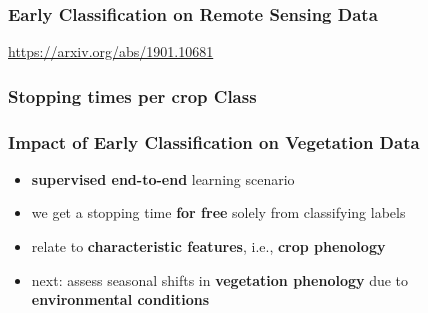 %	
%	
%	


\begin{frame}
\frametitle{Early Classification on Remote Sensing Data}


\url{https://arxiv.org/abs/1901.10681}


\end{frame}

\begin{frame}
	\frametitle{Stopping times per crop Class}
	
	
	
\end{frame}

\begin{frame}
	\frametitle{Impact of Early Classification on Vegetation Data}
	
	\Large
	
	\begin{itemize}[itemsep=1em]
		\item<1-> \textbf{supervised end-to-end} learning scenario
		\item<2-> we get a stopping time \textbf{for free} solely from classifying labels
		\item<3-> relate to \textbf{characteristic features}, i.e., \textbf{crop phenology}
		\item<4-> next: assess seasonal shifts in \textbf{vegetation phenology} due to \textbf{environmental conditions}
	\end{itemize}
	
\end{frame}

